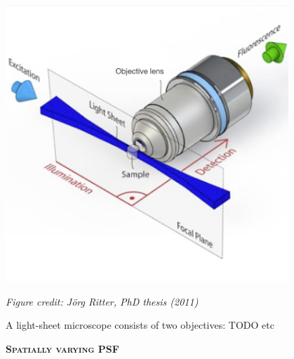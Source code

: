 \documentclass[a0paper,portrait,fontscale=0.35]{baposter}
\newcommand{\mycaption}[1]{
  {
    \smaller
    \emph{#1}
  }
}
\theoremstyle{plain}
\theoremstyle{plain}
\theoremstyle{definition}
\theoremstyle{plain}
\theoremstyle{definition}
\begin{document}
\begin{poster}
{\begin{minipage}[t]{\textwidth}
\begin{minipage}[t]{0.48\textwidth}
      \begin{minipage}[t]{\textwidth}
        \centering
        \includegraphics[width=0.8\textwidth]{img/spim.png}
       
        \mycaption{Figure credit: J\"{o}rg Ritter, PhD thesis (2011)}
      \end{minipage}
     

      \hspace{1em}
      
      A light-sheet microscope consists of two objectives: TODO etc
    
    \end{minipage}
    \begin{minipage}[t]{0.48\textwidth}
      \begin{center}
        \larger
        {\color{blue}\textbf{\textsc{Spatially varying PSF}}}\\
      \end{center}
      

\end{minipage}
\end{minipage}}
\end{poster}
\end{document}
